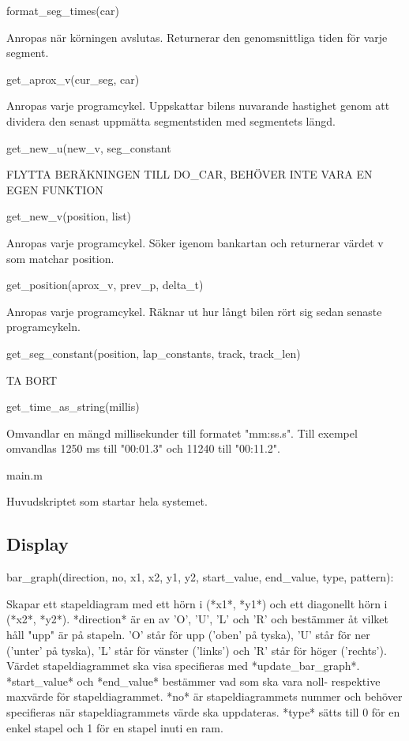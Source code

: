 format\_seg\_times(car)

Anropas när körningen avslutas. Returnerar den genomsnittliga tiden för varje
segment.

get\_aprox\_v(cur\_seg, car)

Anropas varje programcykel. Uppskattar bilens nuvarande hastighet genom att
dividera den senast uppmätta segmentstiden med segmentets längd.

get\_new\_u(new\_v, seg\_constant

FLYTTA BERÄKNINGEN TILL DO\_CAR, BEHÖVER INTE VARA EN EGEN FUNKTION

get\_new\_v(position, list)

Anropas varje programcykel. Söker igenom bankartan och returnerar värdet v som
matchar position.

get\_position(aprox\_v, prev\_p, delta\_t)

Anropas varje programcykel. Räknar ut hur långt bilen rört sig sedan senaste
programcykeln.

get\_seg\_constant(position, lap\_constants, track, track\_len)

TA BORT

get\_time\_as\_string(millis)

Omvandlar en mängd millisekunder till formatet "mm:ss.s". Till exempel omvandlas 1250
ms till "00:01.3" och 11240 till "00:11.2".

main.m

Huvudskriptet som startar hela systemet.

\subsection{Display}
\label{app:funktioner och filer:display}
bar\_graph(direction, no, x1, x2, y1, y2, start\_value, end\_value, type, pattern):

Skapar ett stapeldiagram med ett hörn i (*x1*, *y1*) och ett diagonellt
hörn i (*x2*, *y2*). *direction* är en av 'O', 'U', 'L' och 'R' och
bestämmer åt vilket håll "upp" är på stapeln. 'O' står för upp ('oben'
på tyska), 'U' står för ner ('unter' på tyska), 'L' står för vänster
('links') och 'R' står för höger ('rechts'). Värdet stapeldiagrammet ska
visa specifieras med *update\_bar\_graph*. *start\_value* och
*end\_value* bestämmer vad som ska vara noll- respektive maxvärde för
stapeldiagrammet. *no* är stapeldiagrammets nummer och behöver
specifieras när stapeldiagrammets värde ska uppdateras. *type* sätts
till 0 för en enkel stapel och 1 för en stapel inuti en ram.


